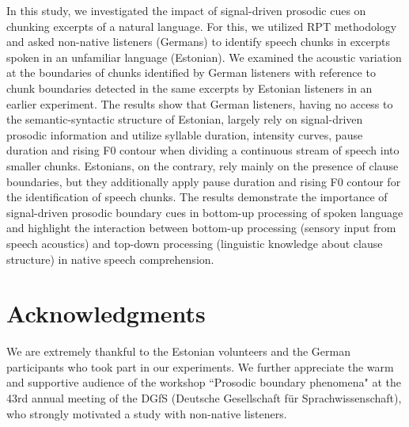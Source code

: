 \documentclass[output=paper]{langscibook}
\begin{document}
    In this study, we investigated the impact of signal-driven prosodic cues on chunking excerpts of a natural language. For this, we utilized RPT methodology and asked non-native listeners (Germans) to identify speech chunks in excerpts spoken in an unfamiliar language (Estonian). We examined the acoustic variation at the boundaries of chunks identified by German listeners with reference to chunk boundaries detected in the same excerpts by Estonian listeners in an earlier experiment. The results show that German listeners, having no access to the semantic-syntactic structure of Estonian, largely rely on signal-driven prosodic information and utilize syllable duration, intensity curves, pause duration and rising F0 contour when dividing a continuous stream of speech into smaller chunks. Estonians, on the contrary, rely mainly on the presence of clause boundaries, but they additionally apply pause duration and rising F0 contour for the identification of speech chunks. The results demonstrate the importance of signal-driven prosodic boundary cues in bottom-up processing of spoken language and highlight the interaction between bottom-up processing (sensory input from speech acoustics) and top-down processing (linguistic knowledge about clause structure) in native speech comprehension.
    \largerpage





\section*{Acknowledgments}

We are extremely thankful to the Estonian volunteers and the German participants who took part in our experiments. We further appreciate the warm and supportive audience of the workshop ``Prosodic boundary phenomena" at the 43rd annual meeting of the DGfS (Deutsche Gesellschaft für Sprachwissenschaft), who strongly motivated a study with non-native listeners.
\end{document}
